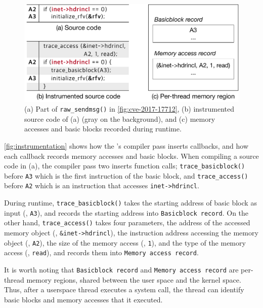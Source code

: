 \begin{figure}
  \centering
  \includegraphics[width=\linewidth]{fig/instrumentation.pdf}
  \caption{(a) Part of \texttt{raw_sendmsg()} in
    \autoref{fig:cve-2017-17712}, (b) instrumented source code of (a)
    (gray on the background), and (c) memory accesses and basic blocks
    recorded during runtime.}
  \label{fig:instrumentation}
\end{figure}

\autoref{fig:instrumentation} shows how the \sys's compiler pass
inserts callbacks, and how each callback records memory accesses and
basic blocks.
%
When compiling a source code in (a), the compiler pass two inserts
function calls; \texttt{trace_basicblock()} before \texttt{A3} which
is the first instruction of the basic block, and
\texttt{trace_access()} before \texttt{A2} which is an instruction
that accesses \texttt{inet->hdrincl}.


During runtime, \texttt{trace_basicblock()} takes the starting address
of basic block as input (\ie, \texttt{A3}), and records the starting
address into \texttt{Basicblock record}.
%
On the other hand, \texttt{trace_access()} takes four parameters, the
address of the accessed memory object (\ie, \texttt{\&inet->hdrincl}),
the instruction address accessing the memory object (\ie,
\texttt{A2}), the size of the memory access (\ie, \texttt{1}), and
the type of the memory access (\ie, \texttt{read}), and records them
into \texttt{Memory access record}.






It is worth noting that \texttt{Basicblock record} and \texttt{Memory
  access record} are per-thread memory regions, shared between the
user space and the kernel space. Thus, after a userspace thread
executes a system call, the thread can identify basic blocks and
memory accesses that it executed.







